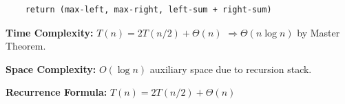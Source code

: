 \documentclass[a4paper,12pt]{article}
\begin{document}
\begin{tcolorbox}[
    colback=gray!30,
    colframe=black,
    boxrule=1pt,
    arc=0mm
]
\begin{tcolorbox}[
    colback=black!5,
    colframe=black,
    arc=0mm,
    title=Pseudo-code
]
\begin{lstlisting}
    return (max-left, max-right, left-sum + right-sum)
\end{lstlisting}
\end{tcolorbox}


\begin{tcolorbox}[
    colback=cyan!20,
    colframe=black,
    arc=0mm
]
\small
\textbf{Time Complexity:}
$T(n)=2T(n/2)+\Theta(n)$
$\Rightarrow \Theta(n\log n)$ by Master Theorem.
\end{tcolorbox}


\begin{tcolorbox}[
    colback=violet!20,
    colframe=black,
    arc=0mm
]
\small
\textbf{Space Complexity:}
$O(\log n)$ auxiliary space due to recursion stack.
\end{tcolorbox}


\begin{tcolorbox}[
    colback=pink!20,
    colframe=black,
    arc=0mm
]
\small
\textbf{Recurrence Formula:}
$T(n)=2T(n/2)+\Theta(n)$
\end{tcolorbox}

\end{tcolorbox}
\end{document}
